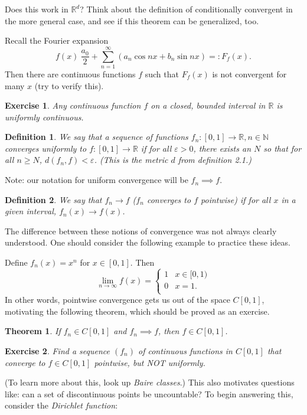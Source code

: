 \documentclass{article}
\newtheorem{thm}{Theorem}[section]
\newtheorem{defn}{Definition}[section]
\newtheorem{exer}{Exercise}[section]
\begin{document}
Does this work in $\mathbb{R}^d$? Think about the definition of conditionally convergent in the more general case, and see if this theorem can be generalized, too. 

Recall the Fourier expansion
\begin{equation}
    f(x) ~ \frac{a_{0}}{2} + \sum_{n=1}^{\infty} (a_{n}\cos nx + b_{n}\sin nx) =: F_{f}(x).
\end{equation}
Then there are continuous functions $f$ such that $F_{f}(x)$ is not convergent for many $x$ (try to verify this). 

\begin{exer}
Any continuous function $f$ on a closed, bounded interval in $\mathbb{R}$ is uniformly continuous.
\end{exer}

\begin{defn}
We say that a sequence of functions $f_{n} : [0,1] \to \mathbb{R}, n \in \mathbb{N}$ converges uniformly to $f : [0,1] \to \mathbb{R}$ if for all $\varepsilon > 0$, there exists an $N$ so that for all $n \geq N$, $d(f_{n}, f) < \varepsilon$. (This is the metric $d$ from definition 2.1.)
\end{defn}
Note: our notation for uniform convergence will be $f_{n} \implies f$. 

\begin{defn}
We say that $f_{n} \rightarrow f$ ($f_{n}$ converges to $f$ pointwise) if for all $x$ in a given interval, $f_{n}(x) \rightarrow f(x)$.
\end{defn}
The difference between these notions of convergence was not always clearly understood. One should consider the following example to practice these ideas.

Define $f_{n}(x) = x^{n}$ for $x \in [0,1]$. Then
\[ \lim_{n \rightarrow \infty} f(x) =   \left\{
\begin{array}{ll}
      1 &  x \in [0,1) \\
      0 &  x=1 .  \\
\end{array} 
\right. \]
In other words, pointwise convergence gets us out of the space $C[0,1]$, motivating the following theorem, which should be proved as an exercise.

\begin{thm}
If $f_{n} \in C[0,1]$ and $f_{n} \implies f$, then $f \in C[0,1]$.
\end{thm}

\begin{exer}
Find a sequence $(f_{n})$ of continuous functions in $C[0,1]$ that converge to $f \in C[0,1]$ pointwise, but NOT uniformly.
\end{exer}
(To learn more about this, look up \textit{Baire classes}.) This also motivates questions like: can a set of discontinuous points be uncountable? To begin answering this, consider the \textit{Dirichlet function}:
\end{document}
